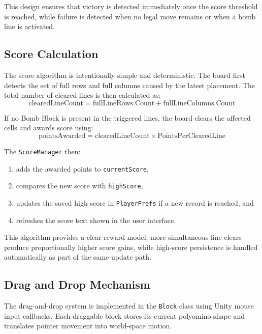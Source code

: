 \documentclass[a4paper,12pt]{report}
\begin{document}
This design ensures that victory is detected immediately once the score threshold is reached, while failure is detected when no legal move remains or when a bomb line is activated.

\subsection{Score Calculation}
The score algorithm is intentionally simple and deterministic. The board first detects the set of full rows and full columns caused by the latest placement. The total number of cleared lines is then calculated as:
\[
\text{clearedLineCount} = \text{fullLineRows.Count} + \text{fullLineColumns.Count}
\]

If no Bomb Block is present in the triggered lines, the board clears the affected cells and awards score using:
\[
\text{pointsAwarded} = \text{clearedLineCount} \times \text{PointsPerClearedLine}
\]

The \texttt{ScoreManager} then:
\begin{enumerate}
    \item adds the awarded points to \texttt{currentScore},
    \item compares the new score with \texttt{highScore},
    \item updates the saved high score in \texttt{PlayerPrefs} if a new record is reached, and
    \item refreshes the score text shown in the user interface.
\end{enumerate}

This algorithm provides a clear reward model: more simultaneous line clears produce proportionally higher score gains, while high-score persistence is handled automatically as part of the same update path.

\subsection{Drag and Drop Mechanism}
The drag-and-drop system is implemented in the \texttt{Block} class using Unity mouse input callbacks. Each draggable block stores its current polyomino shape and translates pointer movement into world-space motion.
\end{document}
